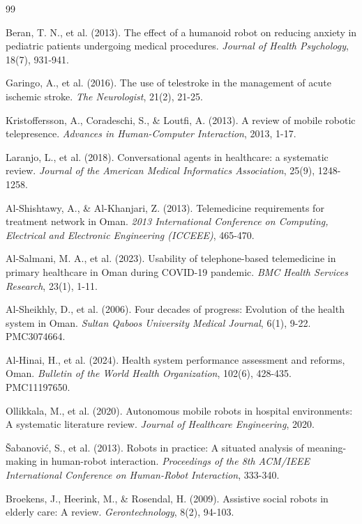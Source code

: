 \documentclass[11pt,a4paper]{article}
\begin{document}
\begin{thebibliography}{99}

Beran, T. N., et al. (2013). The effect of a humanoid robot on reducing anxiety in pediatric patients undergoing medical procedures. \textit{Journal of Health Psychology}, 18(7), 931-941.

Garingo, A., et al. (2016). The use of telestroke in the management of acute ischemic stroke. \textit{The Neurologist}, 21(2), 21-25.

Kristoffersson, A., Coradeschi, S., \& Loutfi, A. (2013). A review of mobile robotic telepresence. \textit{Advances in Human-Computer Interaction}, 2013, 1-17.

Laranjo, L., et al. (2018). Conversational agents in healthcare: a systematic review. \textit{Journal of the American Medical Informatics Association}, 25(9), 1248-1258.

Al-Shishtawy, A., \& Al-Khanjari, Z. (2013). Telemedicine requirements for treatment network in Oman. \textit{2013 International Conference on Computing, Electrical and Electronic Engineering (ICCEEE)}, 465-470.

Al-Salmani, M. A., et al. (2023). Usability of telephone-based telemedicine in primary healthcare in Oman during COVID-19 pandemic. \textit{BMC Health Services Research}, 23(1), 1-11.

Al-Sheikhly, D., et al. (2006). Four decades of progress: Evolution of the health system in Oman. \textit{Sultan Qaboos University Medical Journal}, 6(1), 9-22. PMC3074664.

Al-Hinai, H., et al. (2024). Health system performance assessment and reforms, Oman. \textit{Bulletin of the World Health Organization}, 102(6), 428-435. PMC11197650.

Ollikkala, M., et al. (2020). Autonomous mobile robots in hospital environments: A systematic literature review. \textit{Journal of Healthcare Engineering}, 2020.

Šabanović, S., et al. (2013). Robots in practice: A situated analysis of meaning-making in human-robot interaction. \textit{Proceedings of the 8th ACM/IEEE International Conference on Human-Robot Interaction}, 333-340.

Broekens, J., Heerink, M., \& Rosendal, H. (2009). Assistive social robots in elderly care: A review. \textit{Gerontechnology}, 8(2), 94-103.


\end{thebibliography}
\end{document}

